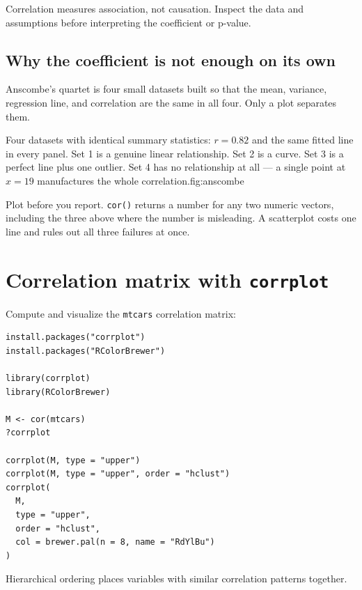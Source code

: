 \begin{pitfall}
Correlation measures association, not causation. Inspect the data and assumptions before interpreting the coefficient or p-value.
\end{pitfall}

\subsection{Why the coefficient is not enough on its own}
Anscombe's quartet is four small datasets built so that the mean, variance,
regression line, and correlation are the same in all four. Only a plot
separates them.

\begin{utpfig}{Four datasets with identical summary
statistics: $r = 0.82$ and the same fitted line in every panel. Set 1 is a
genuine linear relationship. Set 2 is a curve. Set 3 is a perfect line plus
one outlier. Set 4 has no relationship at all --- a single point at $x = 19$
manufactures the whole correlation.}{fig:anscombe}

\end{utpfig}

\begin{keyidea}
Plot before you report. \texttt{cor()} returns a number for any two numeric
vectors, including the three above where the number is misleading. A
scatterplot costs one line and rules out all three failures at once.
\end{keyidea}

\section{Correlation matrix with \texttt{corrplot}}

Compute and visualize the \texttt{mtcars} correlation matrix:

\begin{lstlisting}[style=dsr]
install.packages("corrplot")
install.packages("RColorBrewer")

library(corrplot)
library(RColorBrewer)

M <- cor(mtcars)
?corrplot

corrplot(M, type = "upper")
corrplot(M, type = "upper", order = "hclust")
corrplot(
  M,
  type = "upper",
  order = "hclust",
  col = brewer.pal(n = 8, name = "RdYlBu")
)
\end{lstlisting}

Hierarchical ordering places variables with similar correlation patterns together.

